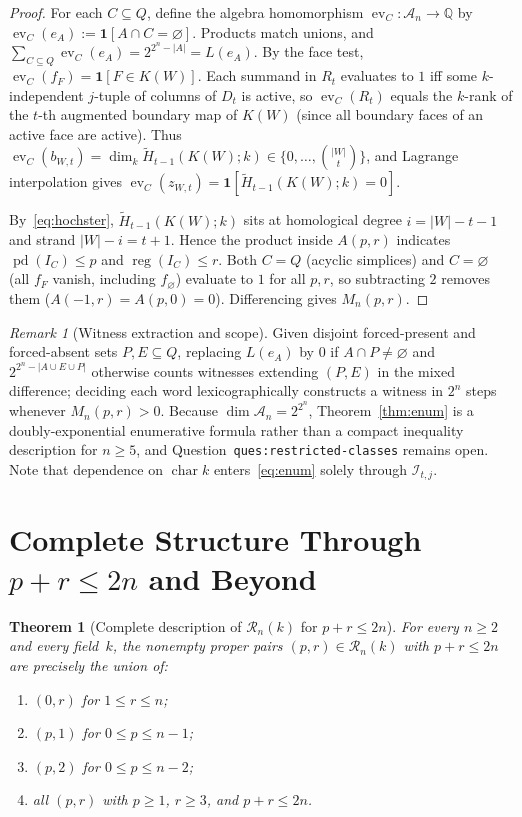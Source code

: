 \documentclass[11pt]{article}
\theoremstyle{plain}
\newtheorem{theorem}{Theorem}
\theoremstyle{definition}
\theoremstyle{remark}
\newtheorem{remark}{Remark}
\DeclareMathOperator{\pd}{pd}
\DeclareMathOperator{\reg}{reg}
\DeclareMathOperator{\ev}{ev}
\DeclareMathOperator{\chark}{char}
\begin{document}
\begin{proof}
For each $C \subseteq Q$, define the algebra homomorphism $\ev_C : \mathcal{A}_n \to \mathbb{Q}$ by $\ev_C(e_A) := \mathbf{1}[A \cap C = \varnothing]$. Products match unions, and $\sum_{C \subseteq Q} \ev_C(e_A) = 2^{2^n - |A|} = L(e_A)$. By the face test, $\ev_C(f_F) = \mathbf{1}[F \in K(W)]$. Each summand in $R_t$ evaluates to $1$ iff some $k$-independent $j$-tuple of columns of $D_t$ is active, so $\ev_C(R_t)$ equals the $k$-rank of the $t$-th augmented boundary map of $K(W)$ (since all boundary faces of an active face are active). Thus $\ev_C(b_{W,t}) = \dim_k \widetilde{H}_{t-1}(K(W);k) \in \{0,\dots,\binom{|W|}{t}\}$, and Lagrange interpolation gives $\ev_C(z_{W,t}) = \mathbf{1}[\widetilde{H}_{t-1}(K(W);k) = 0]$.

By~\eqref{eq:hochster}, $\widetilde{H}_{t-1}(K(W);k)$ sits at homological degree $i = |W|-t-1$ and strand $|W|-i = t+1$. Hence the product inside $A(p,r)$ indicates $\pd(I_C) \le p$ and $\reg(I_C) \le r$. Both $C = Q$ (acyclic simplices) and $C = \varnothing$ (all $f_F$ vanish, including $f_\varnothing$) evaluate to $1$ for all $p,r$, so subtracting $2$ removes them ($A(-1,r) = A(p,0) = 0$). Differencing gives $M_n(p,r)$.
\end{proof}

\begin{remark}[Witness extraction and scope]
Given disjoint forced-present and forced-absent sets $P, E \subseteq Q$, replacing $L(e_A)$ by $0$ if $A \cap P \neq \varnothing$ and $2^{2^n - |A\cup E\cup P|}$ otherwise counts witnesses extending $(P,E)$ in the mixed difference; deciding each word lexicographically constructs a witness in $2^n$ steps whenever $M_n(p,r) > 0$. Because $\dim \mathcal{A}_n = 2^{2^n}$, Theorem~\ref{thm:enum} is a doubly-exponential enumerative formula rather than a compact inequality description for $n \ge 5$, and Question~\texttt{ques:restricted-classes} remains open. Note that dependence on $\chark k$ enters~\eqref{eq:enum} solely through $\mathcal{I}_{t,j}$.
\end{remark}

\section{Complete Structure Through \texorpdfstring{$p+r \le 2n$}{p + r <= 2n} and Beyond}

\begin{theorem}[Complete description of $\mathcal{R}_n(k)$ for $p+r \le 2n$]\label{thm:diag}
For every $n \ge 2$ and every field~$k$, the nonempty proper pairs $(p,r) \in \mathcal{R}_n(k)$ with $p+r \le 2n$ are precisely the union of:
\begin{enumerate}[label=\textup{(\arabic*)}]
\item $(0,r)$ for $1 \le r \le n$;
\item $(p,1)$ for $0 \le p \le n-1$;
\item $(p,2)$ for $0 \le p \le n-2$;
\item all $(p,r)$ with $p \ge 1$, $r \ge 3$, and $p+r \le 2n$.
\end{enumerate}
\end{theorem}
\end{document}
